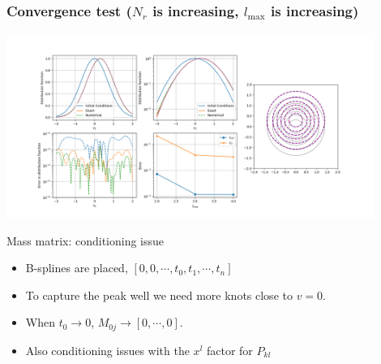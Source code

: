 \documentclass[mathserif, aspectratio=169]{beamer}
\newcommand{\vect}[1]{\boldsymbol{#1}}
\newcommand{\of}[1]{\mleft( #1 \mright)}
\begin{document}
\begin{frame}
\frametitle{\small Convergence test ($N_r$ is increasing, $l_{\max}$ is increasing)}
\begin{center}
\includegraphics[width=0.9\textwidth]{figures/splines/nr_16_to_64_lmax_2_to_4.png}
\end{center}
\end{frame}

\begin{frame}{Mass matrix: conditioning issue}
	\begin{itemize}
		\item B-splines are placed, $[0,0,\cdots, t_0, t_1, \cdots, t_n]$
		\item To capture the peak well we need more knots close to $v=0$. 
		\item When $t_0 \rightarrow 0$, $M_{0j} \rightarrow [0,\cdots,0]$.
		\item Also conditioning issues with the $x^l$ factor for $P_{kl}$
	\end{itemize}
	
\end{frame}
\end{document}
